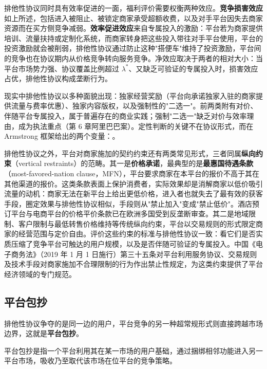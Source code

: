 排他性协议同时具有效率促进的一面，福利评价需要权衡两种效应。\textbf{竞争损害效应}如上所述，包括进入被阻止、被锁定商家承受超额收费，以及对手平台因失去商家资源而在买方侧竞争减弱。\textbf{效率促进效应}来自专属投入的激励：平台若为商家提供培训、流量扶持或定制化系统，而商家转身把这些投入带往对手平台使用，平台的投资激励就会被削弱，排他性协议通过防止这种"搭便车"维持了投资激励，平台间的竞争也在协议期内从价格竞争转向服务竞争。净效应取决于两者的相对大小：当平台市场势力强、协议覆盖比例超过 $\lambda^*$、又缺乏可验证的专属投入时，损害效应占优，排他性协议构成垄断行为。

现实中排他性协议以多种面貌出现：独家经营奖励（平台向承诺独家入驻的商家提供流量与费率优惠）、独家内容版权，以及强制性的"二选一"。前两类附有对价、伴随平台专属投入，属于普遍存在的商业实践；强制"二选一"缺乏对价与效率理由，成为执法重点（第 6 章阿里巴巴案）。定性判断的关键不在协议形式，而在 Armstrong 框架给出的两个变量：。

排他性协议之外，平台对商家施加的契约约束还有两类常见形式，三者同属\textbf{纵向约束}（vertical restraints）的范畴。其一是\textbf{价格承诺}，最典型的是\textbf{最惠国待遇条款}（most-favored-nation clause，MFN），平台要求商家在本平台的报价不高于其在其他渠道的报价。这类条款表面上保护消费者，实际效果却是消解商家以低价吸引流量的动机：商家无法在新平台上给出更低价格，进入者也就失去了最有效的获客手段，圈定效果与排他性协议相似，手段则从"禁止加入"变成"禁止低价"。酒店预订平台与电商平台的价格平价条款已在欧洲多国受到反垄断审查。其二是地域限制、客户限制与最低转售价格维持等传统纵向约束，平台以交易规则的形式限定商家的经营范围与定价自由。评价这些约束的标准与排他性协议一致：看它们是否实质压缩了竞争平台可触达的用户规模，以及是否伴随可验证的专属投入。中国《电子商务法》（2019 年 1 月 1 日施行）第三十五条对平台利用服务协议、交易规则及技术手段对商家施加不合理限制的行为作出禁止性规定，为这类约束提供了平台经济领域的专门规范。

\subsection{平台包抄}

排他性协议争夺的是同一边的用户，平台竞争的另一种超常规形式则直接跨越市场边界，这就是\textbf{平台包抄}。

\begin{definition}
平台包抄是指一个平台利用其在某一市场的用户基础，通过捆绑相邻功能进入另一平台市场，吸收乃至取代该市场在位平台的竞争策略。
\end{definition}


